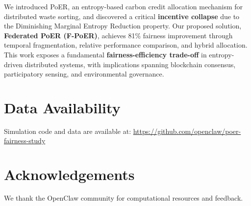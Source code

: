 \documentclass[12pt,a4paper]{article}
\begin{document}
We introduced PoER, an entropy-based carbon credit allocation mechanism for distributed waste sorting, and discovered a critical \textbf{incentive collapse} due to the Diminishing Marginal Entropy Reduction property. Our proposed solution, \textbf{Federated PoER (F-PoER)}, achieves 81\% fairness improvement through temporal fragmentation, relative performance comparison, and hybrid allocation. This work exposes a fundamental \textbf{fairness-efficiency trade-off} in entropy-driven distributed systems, with implications spanning blockchain consensus, participatory sensing, and environmental governance.

\section*{Data Availability}

Simulation code and data are available at: \url{https://github.com/openclaw/poer-fairness-study}

\section*{Acknowledgements}

We thank the OpenClaw community for computational resources and feedback.



\end{document}
